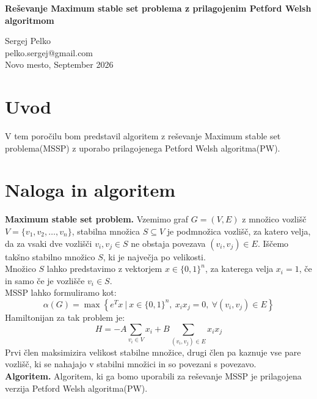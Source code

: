 \documentclass[slovenian, 10pt, titlepage, a4paper]{article}
\begin{document}
\begin{titlepage}
{\centering

\vspace{5cm}
{\huge\textbf{Reševanje Maximum stable set problema z prilagojenim Petford Welsh algoritmom}}

\vspace{2cm}
{Sergej Pelko}\\
{\small{pelko.sergej@gmail.com}}\\
\vspace{0.5cm}
{Novo mesto, September 2026}\\
\vspace{0.5cm}
}
\end{titlepage}

\section{Uvod}
V tem poročilu bom predstavil algoritem z reševanje Maximum stable set problema(MSSP) z uporabo prilagojenega Petford Welsh algoritma(PW).


\section{Naloga in algoritem}
    \textbf{Maximum stable set problem.}
    Vzemimo graf $G = (V, E)$ z množico vozlišč $V = \{v_1, v_2, \ldots, v_n\}$, stabilna množica $S \subseteq V$ je podmnožica vozlišč, za katero velja, da za vsaki dve vozlišči $v_i, v_j \in S$ ne obstaja povezava $(v_i, v_j) \in E$.
    Iščemo takšno stabilno množico $S$, ki je največja po velikosti.\\
    Množico $S$ lahko predstavimo z vektorjem $x \in \{0, 1\}^n$, za katerega velja $x_i = 1$, če in samo če je vozlišče $v_i \in S$.\\
    MSSP lahko formuliramo kot:
    $$ \alpha(G) = \max \left\{ e^T x\ |\ x \in \{0, 1\}^n,\ x_i x_j = 0,\ \forall (v_i, v_j) \in E \right\} $$
    Hamiltonijan za tak problem je:
    $$ H = -A \sum_{v_i \in V} x_i + B \sum_{(v_i, v_j) \in E} x_i x_j $$
    Prvi člen maksimizira velikost stabilne množice, drugi člen pa kaznuje vse pare vozlišč, ki se nahajajo v stabilni množici in so povezani s povezavo.\\
    \textbf{Algoritem.}
    Algoritem, ki ga bomo uporabili za reševanje MSSP je prilagojena verzija Petford Welsh algoritma(PW).
\end{document}
